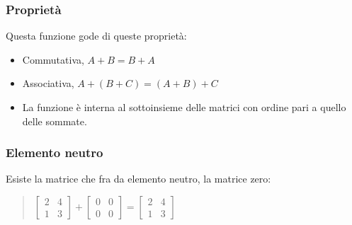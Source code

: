 \documentclass[a4paper]{article}
\begin{document}
\subsubsection{Proprietà}
Questa funzione gode di queste proprietà:
\begin{itemize}
\item Commutativa, $A + B = B + A$
\item Associativa, $A + (B + C) = (A + B) + C$
\item La funzione è interna al sottoinsieme delle matrici con ordine pari a quello delle sommate.
\end{itemize}

\subsubsection{Elemento neutro}
Esiste la matrice che fra da elemento neutro, la matrice zero: 
\\
\begin{quote} \centering $\left[\begin{matrix}2 & 4 \\ 1 & 3\end{matrix}\right] + \left[\begin{matrix}0 & 0 \\ 0 & 0\end{matrix}\right] = \left[\begin{matrix}2 & 4 \\ 1 & 3\end{matrix}\right]
$\end{quote}
\end{document}
